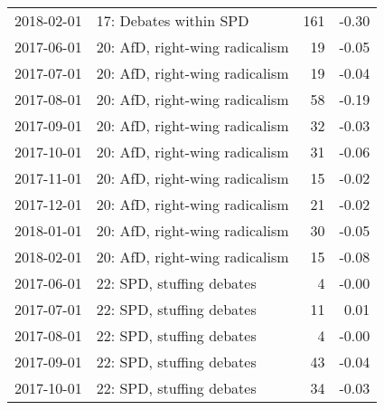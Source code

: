 \begin{adjustbox}{width=\textwidth}
\begin{tabular}{llrr}
  2018-02-01 & 17: Debates within SPD & 161 & -0.30 \\ 
  2017-06-01 & 20: AfD, right-wing radicalism &  19 & -0.05 \\ 
  2017-07-01 & 20: AfD, right-wing radicalism &  19 & -0.04 \\ 
  2017-08-01 & 20: AfD, right-wing radicalism &  58 & -0.19 \\ 
  2017-09-01 & 20: AfD, right-wing radicalism &  32 & -0.03 \\ 
  2017-10-01 & 20: AfD, right-wing radicalism &  31 & -0.06 \\ 
  2017-11-01 & 20: AfD, right-wing radicalism &  15 & -0.02 \\ 
  2017-12-01 & 20: AfD, right-wing radicalism &  21 & -0.02 \\ 
  2018-01-01 & 20: AfD, right-wing radicalism &  30 & -0.05 \\ 
  2018-02-01 & 20: AfD, right-wing radicalism &  15 & -0.08 \\ 
  2017-06-01 & 22: SPD, stuffing debates &   4 & -0.00 \\ 
  2017-07-01 & 22: SPD, stuffing debates &  11 & 0.01 \\ 
  2017-08-01 & 22: SPD, stuffing debates &   4 & -0.00 \\ 
  2017-09-01 & 22: SPD, stuffing debates &  43 & -0.04 \\ 
  2017-10-01 & 22: SPD, stuffing debates &  34 & -0.03 \\ 
   \hline
\end{tabular}
\end{adjustbox}
